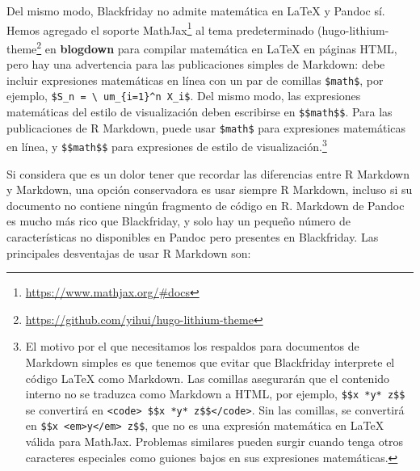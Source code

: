 \documentclass[12pt,]{krantz}
\renewcommand{\href}[2]{#2\footnote{\url{#1}}}
\theoremstyle{definition}
\theoremstyle{definition}
\theoremstyle{definition}
\theoremstyle{remark}
\begin{document}
Del mismo modo, Blackfriday no admite matemática en LaTeX y Pandoc sí.
Hemos agregado el soporte \href{https://www.mathjax.org/\#docs}{MathJax}
 al tema predeterminado
(\href{https://github.com/yihui/hugo-lithium-theme}{hugo-lithium-theme}
en \textbf{blogdown} para compilar matemática en LaTeX en páginas HTML,
pero hay una advertencia para las publicaciones simples de Markdown:
debe incluir expresiones matemáticas en línea con un par de comillas
\texttt{\textasciigrave{}\$math\$\textasciigrave{}}, por ejemplo,
\texttt{\textasciigrave{}\$S\_n\ =\ \textbackslash{}\ um\_\{i=1\}\^{}n\ X\_i\$\textasciigrave{}}.
Del mismo modo, las expresiones matemáticas del estilo de visualización
deben escribirse en
\texttt{\textasciigrave{}\$\$math\$\$\textasciigrave{}}. Para las
publicaciones de R Markdown, puede usar \texttt{\$math\$} para
expresiones matemáticas en línea, y \texttt{\$\$math\$\$} para
expresiones de estilo de visualización.\footnote{El motivo por el que
  necesitamos los respaldos para documentos de Markdown simples es que
  tenemos que evitar que Blackfriday interprete el código LaTeX como
  Markdown. Las comillas asegurarán que el contenido interno no se
  traduzca como Markdown a HTML, por ejemplo,
  \texttt{\textasciigrave{}\$\$x\ *y*\ z\$\$\textasciigrave{}} se
  convertirá en
  \texttt{\textless{}code\textgreater{}\ \$\$x\ *y*\ z\$\$\textless{}/code\textgreater{}}.
  Sin las comillas, se convertirá en
  \texttt{\$\$x\ \textless{}em\textgreater{}y\textless{}/em\textgreater{}\ z\$\$},
  que no es una expresión matemática en LaTeX válida para MathJax.
  Problemas similares pueden surgir cuando tenga otros caracteres
  especiales como guiones bajos en sus expresiones matemáticas.}

Si considera que es un dolor tener que recordar las diferencias entre R
Markdown y Markdown, una opción conservadora es usar siempre R Markdown,
incluso si su documento no contiene ningún fragmento de código en R.
Markdown de Pandoc es mucho más rico que Blackfriday, y solo hay un
pequeño número de características no disponibles en Pandoc pero
presentes en Blackfriday. Las principales desventajas de usar R Markdown
son:
\end{document}
